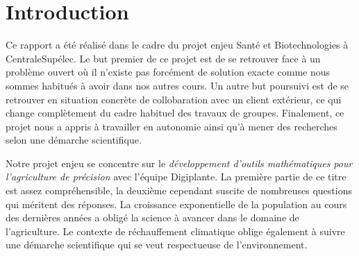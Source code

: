 \section{Introduction}

Ce rapport a été réalisé dans le cadre du projet enjeu Santé
et Biotechnologies à CentraleSupélec.
Le but premier de ce projet est de se retrouver face
à un problème ouvert où il n'existe pas forcément de solution exacte
comme nous sommes habitués à avoir dans nos autres cours.
Un autre but poursuivi est de se retrouver en situation concrète
de collobaration avec un client extérieur,
ce qui change complètement du cadre habituel des travaux de groupes.
Finalement, ce projet nous a appris à travailler en autonomie ainsi
qu'à mener des recherches selon une démarche scientifique.

Notre projet enjeu se concentre sur
le \emph{développement d'outils mathématiques 
pour l'agriculture de précision} avec l'équipe Digiplante.
La première partie de ce titre est assez compréhensible,
la deuxième cependant suscite de nombreuses questions qui méritent
des réponses.
La croissance exponentielle de la population au cours des dernières
années a obligé la science à avancer dans le domaine de l'agriculture.
Le contexte de réchauffement climatique oblige également 
à suivre une démarche scientifique qui se veut respectueuse 
de l'environnement.


